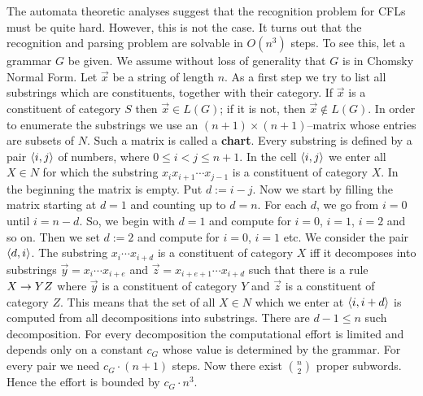 The automata theoretic analyses suggest that the recognition
problem for CFLs must be quite hard.
However, this is not the case. It turns out that the recognition
and parsing problem are solvable in $O(n^3)$ steps. To see this,
let a grammar $G$ be given.  We assume without loss of generality
that $G$ is in Chomsky Normal Form.  Let $\vec{x}$ be a string of
length $n$. As a first step we try to list all substrings which
are constituents, together with their category. If $\vec{x}$ is a
constituent of category $S$ then $\vec{x} \in L(G)$; if it is not,
then $\vec{x} \not\in L(G)$. In order to enumerate the substrings
we use an $(n+1) \times (n+1)$--matrix whose entries
are subsets of $N$. Such a matrix is called a \textbf{chart}.
Every substring is defined by a pair $\langle i,j\rangle$ of numbers,
where $0 \leq i < j \leq n + 1$. In the cell $\langle i,j\rangle$ we
enter all $X \in N$ for which the substring $x_i x_{i+1} \dotsb x_{j-1}$
is a constituent of category $X$. In the beginning the matrix is
empty. Put $d := i - j$. Now we start by filling the matrix 
starting at $d = 1$ and counting up to $d = n$. For each $d$, 
we go from $i = 0$ until $i = n - d$. So, we begin
with $d = 1$ and compute for $i = 0$, $i = 1$, $i = 2$ and so on. 
Then we set $d := 2$ and compute for $i = 0$, $i = 1$ etc. We 
consider the pair $\langle d, i\rangle$. The substring
$x_i \dotsb x_{i+d}$ is a constituent of category $X$ iff
it decomposes into substrings $\vec{y} = x_i \dotsb x_{i+e}$ and
$\vec{z} = x_{i+e+1} \dotsb x_{i+d}$ such that there is a rule
$X \rightarrow Y Z$ where $\vec{y}$ is a constituent of category $Y$ and
$\vec{z}$ is a constituent of category $Z$. This means that the set of
all $X \in N$ which we enter at $\langle i, i+d\rangle$ is computed from
all decompositions into substrings. There are $d - 1 \leq n$
such decomposition. For every decomposition the computational
effort is limited and depends only on a constant $c_G$ whose
value is determined by the grammar. For every pair we need
$c_G \cdot (n+1)$ steps. Now there exist ${n \choose 2}$ proper
subwords. Hence the effort is bounded by $c_G \cdot n^3$.

